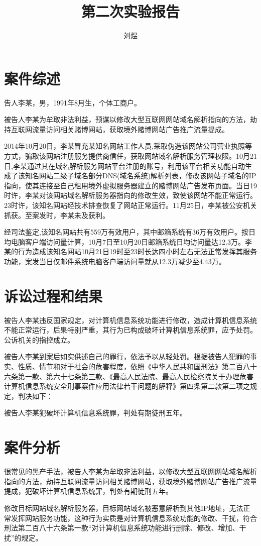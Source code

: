 \documentclass[a4paper,12pt]{article}
\title{第二次实验报告}
\author{刘煜}
\begin{document}
    \maketitle
    \section{案件综述}
    告人李某，男，1991年8月生，个体工商户。

    被告人李某为牟取非法利益，预谋以修改大型互联网网站域名解析指向的方法，劫持互联网流量访问相关赌博网站，获取境外赌博网站广告推广流量提成。

    2014年10月20日，李某冒充某知名网站工作人员,采取伪造该网站公司营业执照等方式，骗取该网站注册服务提供商信任，获取网站域名解析服务管理权限。10月21日,李某通过其在域名解析服务网站平台注册的账号，利用该平台相关功能自动生成了该知名网站二级子域名部分DNS(域名系统)解析列表，修改该网站子域名的IP指向，使其连接至自己租用境外虚拟服务器建立的赌博网站广告发布页面。当日19时许，李某对该网站域名解析服务器指向的修改生效，致使该网站不能正常运行。23时许，该知名网站经技术排查恢复了网站正常运行。11月25日，李某被公安机关抓获。至案发时，李某未及获利。

    经司法鉴定,该知名网站共有559万有效用户，其中邮箱系统有36万有效用户。按日均电脑客户端访问量计算，10月7日至10月20日邮箱系统日均访问量达12.3万。李某的行为造成该知名网站10月21日19时至23时长达四小时左右无法正常发挥其服务功能，案发当日仅邮件系统电脑客户端访问量就从12.3万减少至4.43万。
    
    \section{诉讼过程和结果}
    被告人李某违反国家规定，对计算机信息系统功能进行修改，造成计算机信息系统不能正常运行，后果特别严重，其行为已构成破坏计算机信息系统罪，应予处罚。公诉机关的指控成立。

    被告人李某到案后如实供述自己的罪行，依法予以从轻处罚。根据被告人犯罪的事实、性质、情节和对于社会的危害程度，依照《中华人民共和国刑法》第二百八十六条第一款、第六十七条第三款、《最高人民法院、最高人民检察院关于办理危害计算机信息系统安全刑事案件应用法律若干问题的解释》第四条第二款第二项之规定，判决如下：


    被告人李某犯破坏计算机信息系统罪，判处有期徒刑五年。

    \section{案件分析}
    很常见的黑产手法，被告人李某为牟取非法利益，以修改大型互联网网站域名解析指向的方法，劫持互联网流量访问相关赌博网站，获取境外赌博网站广告推广流量提成，犯破坏计算机信息系统罪，判处有期徒刑五年。

    修改目标网站域名解析服务器，目标网站域名被恶意解析到其他IP地址，无法正常发挥网站服务功能，这种行为实质是对计算机信息系统功能的修改、干扰，符合刑法第二百八十六条第一款“对计算机信息系统功能进行删除、修改、增加、干扰”的规定。
\end{document}
